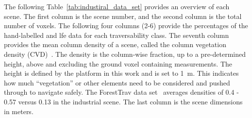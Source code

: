 The following Table~\ref{tab:industiral_data_set} provides an overview of each scene. The first column is the scene number, and the second column is the total number of voxels. The following four columns (2-6) provide the percentages of the hand-labelled and \ac{lfe} data for each traversability class. The seventh column provides the mean column density of a scene, called the column vegetation density (CVD)~\cite{ruetz2024foresttrav}. The density is the column-wise fraction, up to a pre-determined height, above and excluding the ground voxel containing measurements. The height is defined by the platform in this work and is set to \qty{1}{\m}. This indicates how much ``vegetation'' or other elements need to be considered and pushed through to navigate safely. The ForestTrav data set~\cite{ruetz2024foresttrav} averages densities of 0.4 - 0.57 versus 0.13 in the industrial scene. The last column is the scene dimensions in meters. 
 \begin{table*}
\caption{Overview of the industrial data set.}
\label{tab:industiral_data_set}
\end{table*}

